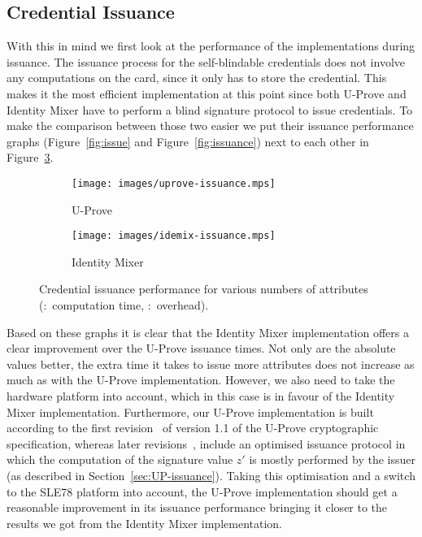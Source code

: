 \subsection{Credential Issuance}

With this in mind we first look at the performance of the implementations during
issuance. The issuance process for the self-blindable credentials does not
involve any computations on the card, since it only has to store the credential.
This makes it the most efficient implementation at this point since both U-Prove
and Identity Mixer have to perform a blind signature protocol to issue
credentials. To make the comparison between those two easier we put their
issuance performance graphs (Figure~\ref{fig:issue} and Figure~\ref{fig:issuance})
next to each other in Figure~\ref{fig:comparison-issuance}.

\begin{figure}[ht]
  \centering
  \begin{subfigure}[b]{0.45\textwidth}
  \texttt{[image: images/uprove-issuance.mps]}
    \caption{U-Prove}
    \label{fig:uprove-issuance}
  \end{subfigure}
  \begin{subfigure}[b]{0.45\textwidth}
  \texttt{[image: images/idemix-issuance.mps]}
    \caption{Identity Mixer}
    \label{fig:idemix-issuance}
  \end{subfigure}

  \caption[Credential issuance performance for various numbers of attributes.]{
    Credential issuance performance for various numbers of attributes
    (:~computation time,
      :~overhead).}
  \label{fig:comparison-issuance}
\end{figure}

Based on these graphs it is clear that the Identity Mixer implementation offers
a clear improvement over the U-Prove issuance times. Not only are the absolute
values better, the extra time it takes to issue more attributes does not
increase as much as with the U-Prove implementation. However, we also need to
take the hardware platform into account, which in this case is in favour of the
Identity Mixer implementation. Furthermore, our U-Prove implementation is built
according to the first revision~\cite{U-Prove_Crypto2011} of version 1.1 of the
U-Prove cryptographic specification, whereas later revisions~\cite{U-Prove_Crypto2013},
include an optimised issuance protocol in which the computation of the signature
value $z'$ is mostly performed by the issuer (as described in Section~\ref{sec:UP-issuance}). Taking
this optimisation and a switch to the SLE78 platform into account, the U-Prove
implementation should get a reasonable improvement in its issuance performance
bringing it closer to the results we got from the Identity Mixer implementation.

